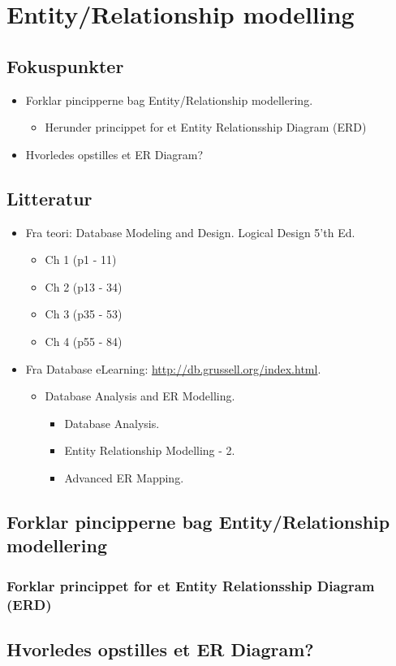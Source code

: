 \section{Entity/Relationship modelling}

\subsection{Fokuspunkter}
\begin{itemize}
	\item Forklar pincipperne bag Entity/Relationship modellering.
	\begin{itemize}
		\item Herunder princippet for et Entity Relationsship Diagram (ERD)
	\end{itemize}
	\item Hvorledes opstilles et ER Diagram?
\end{itemize}

\subsection{Litteratur}
\begin{itemize}
	\item Fra teori: Database Modeling and Design. Logical Design 5'th Ed.
	\begin{itemize}
		\item Ch 1 (p1 - 11)
		\item Ch 2 (p13 - 34)
		\item Ch 3 (p35 - 53)
		\item Ch 4 (p55 - 84)
	\end{itemize}
	\item Fra Database eLearning: \url{http://db.grussell.org/index.html}.
	\begin{itemize}
		\item Database Analysis and ER Modelling.
		\begin{itemize}
			\item Database Analysis.
			\item Entity Relationship Modelling - 2.
			\item Advanced ER Mapping.
		\end{itemize}
	\end{itemize}
\end{itemize}

\newpage

\subsection{Forklar pincipperne bag Entity/Relationship modellering}

\subsubsection{Forklar princippet for et Entity Relationsship Diagram (ERD)}

\subsection{Hvorledes opstilles et ER Diagram?}